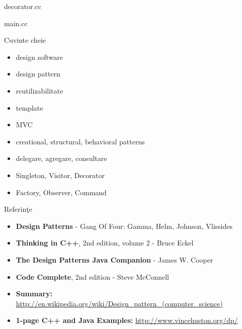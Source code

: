 \documentclass{beamer}
\begin{document}
\begin{frame}{decorator.cc}
	\footnotesize{}
\end{frame}

\begin{frame}{main.cc}
	\footnotesize{}
\end{frame}

\begin{frame}{Cuvinte cheie}
	\begin{itemize}
		\item design software
		\item design pattern
		\item reutilizabilitate
		\item template
		\item MVC
		\item creational, structural, behavioral patterns
		\item delegare, agregare, consultare
		\item Singleton, Visitor, Decorator
		\item Factory, Observer, Command
	\end{itemize}
\end{frame}

\begin{frame}{Referinţe}
	\begin{itemize}
		\item \textbf{Design Patterns} - Gang Of Four: Gamma, Helm, Johnson, Vlissides
		\vspace{4mm}
		\item \textbf{Thinking in C++}, 2nd edition, volume 2 - Bruce Eckel
		\vspace{4mm}
		\item \textbf{The Design Patterns Java Companion} - James W. Cooper
		\vspace{4mm}
		\item \textbf{Code Complete}, 2nd edition - Steve McConnell
		\vspace{4mm}
		\item \textbf{Summary:} \url{http://en.wikipedia.org/wiki/Design_pattern_(computer_science)}
		\vspace{4mm}
		\item \textbf{1-page C++ and Java Examples:} \url{http://www.vincehuston.org/dp/}
	\end{itemize}
\end{frame}
\end{document}
